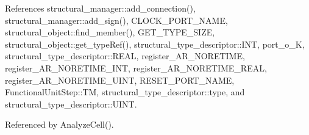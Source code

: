 References structural\+\_\+manager\+::add\+\_\+connection(), structural\+\_\+manager\+::add\+\_\+sign(), C\+L\+O\+C\+K\+\_\+\+P\+O\+R\+T\+\_\+\+N\+A\+ME, structural\+\_\+object\+::find\+\_\+member(), G\+E\+T\+\_\+\+T\+Y\+P\+E\+\_\+\+S\+I\+ZE, structural\+\_\+object\+::get\+\_\+type\+Ref(), structural\+\_\+type\+\_\+descriptor\+::\+I\+NT, port\+\_\+o\+\_\+K, structural\+\_\+type\+\_\+descriptor\+::\+R\+E\+AL, register\+\_\+\+A\+R\+\_\+\+N\+O\+R\+E\+T\+I\+ME, register\+\_\+\+A\+R\+\_\+\+N\+O\+R\+E\+T\+I\+M\+E\+\_\+\+I\+NT, register\+\_\+\+A\+R\+\_\+\+N\+O\+R\+E\+T\+I\+M\+E\+\_\+\+R\+E\+AL, register\+\_\+\+A\+R\+\_\+\+N\+O\+R\+E\+T\+I\+M\+E\+\_\+\+U\+I\+NT, R\+E\+S\+E\+T\+\_\+\+P\+O\+R\+T\+\_\+\+N\+A\+ME, Functional\+Unit\+Step\+::\+TM, structural\+\_\+type\+\_\+descriptor\+::type, and structural\+\_\+type\+\_\+descriptor\+::\+U\+I\+NT.



Referenced by Analyze\+Cell().

